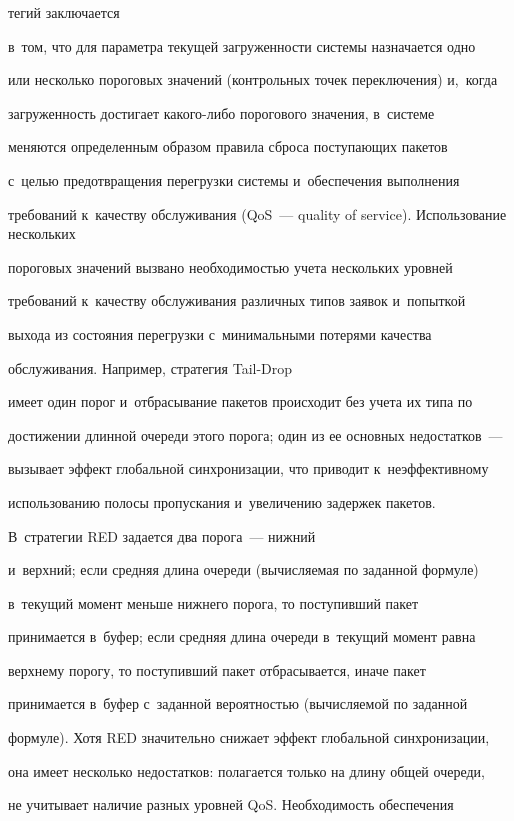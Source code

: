 \noindent


тегий заключается 


в~том, что для параметра текущей загруженности системы назначается одно 


или несколько пороговых значений (контрольных точек переключения) и,~когда 


загруженность достигает ка\-ко\-го-ли\-бо порогового значения, в~системе 


меняются определенным образом правила сброса поступающих пакетов 


с~целью предотвращения перегрузки системы и~обеспечения выполнения 


требований к~качеству обслуживания (QoS~--- quality of service). Использование нескольких 


пороговых значений вызвано необходимостью учета нескольких уровней 


требований к~качеству обслуживания различных типов заявок и~попыткой 


выхода из состояния перегрузки с~минимальными потерями качества 


обслуживания. Например, стратегия Tail-Drop  


имеет один порог и~отбрасывание пакетов происходит без учета их типа по 


достижении длинной очереди этого порога; один из ее основных недостатков~--- 


вызывает эффект глобальной синхронизации, что приводит к~неэффективному 


использованию полосы пропускания и~увеличению задержек пакетов. 


В~стратегии RED задается два порога~--- нижний 


и~верхний; если средняя длина очереди (вычисляемая по заданной формуле) 


в~текущий момент меньше нижнего порога, то поступивший пакет 


принимается в~буфер; если средняя длина очереди в~текущий момент равна 


верхнему порогу, то поступивший пакет отбрасывается, иначе пакет 


принимается в~буфер с~заданной вероятностью (вычисляемой по заданной 


формуле). Хотя RED значительно снижает эффект глобальной синхронизации, 


она имеет несколько недостатков: полагается только на длину общей очереди, 


не учитывает наличие разных уровней QoS. Необходимость обеспечения 


